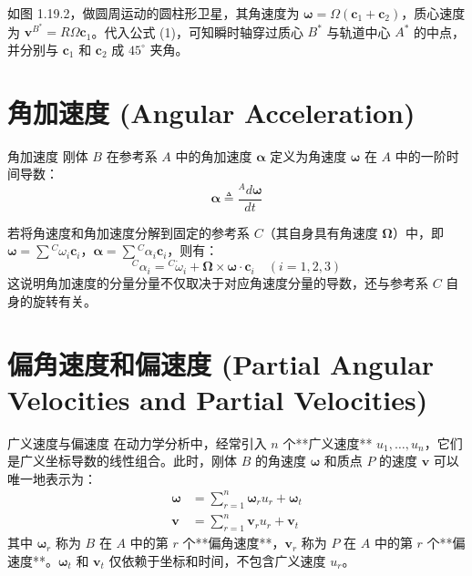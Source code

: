 \begin{example}[圆柱卫星的瞬时轴]
如图 1.19.2，做圆周运动的圆柱形卫星，其角速度为 \(\boldsymbol{\omega} = \Omega (\mathbf{c}_1 + \mathbf{c}_2)\)，质心速度为 \(\mathbf{v}^{B^*} = R\Omega \mathbf{c}_1\)。代入公式 (1)，可知瞬时轴穿过质心 \(B^*\) 与轨道中心 \(A^*\) 的中点，并分别与 \(\mathbf{c}_1\) 和 \(\mathbf{c}_2\) 成 \(45^\circ\) 夹角。
\end{example}

\section{角加速度 (Angular Acceleration)}

\begin{mydefinition}{角加速度}
刚体 \(B\) 在参考系 \(A\) 中的角加速度 \(\boldsymbol{\alpha}\) 定义为角速度 \(\boldsymbol{\omega}\) 在 \(A\) 中的一阶时间导数：
\begin{equation}
\boldsymbol{\alpha} \triangleq \frac{{}^A d\boldsymbol{\omega}}{dt} \tag{1}
\end{equation}
\end{mydefinition}

若将角速度和角加速度分解到固定的参考系 \(C\)（其自身具有角速度 \(\boldsymbol{\Omega}\)）中，即 \(\boldsymbol{\omega} = \sum {}^C\omega_i \mathbf{c}_i\)，\(\boldsymbol{\alpha} = \sum {}^C\alpha_i \mathbf{c}_i\)，则有：
\begin{equation}
{}^C \alpha_i = {}^C \dot{\omega}_i + \boldsymbol{\Omega} \times \boldsymbol{\omega} \cdot \mathbf{c}_i \quad (i=1,2,3) \tag{4}
\end{equation}
这说明角加速度的分量分量不仅取决于对应角速度分量的导数，还与参考系 \(C\) 自身的旋转有关。

\section{偏角速度和偏速度 (Partial Angular Velocities and Partial Velocities)}

\begin{mydefinition}{广义速度与偏速度}
在动力学分析中，经常引入 \(n\) 个**广义速度** \(u_1, \dots, u_n\)，它们是广义坐标导数的线性组合。此时，刚体 \(B\) 的角速度 \(\boldsymbol{\omega}\) 和质点 \(P\) 的速度 \(\mathbf{v}\) 可以唯一地表示为：
\begin{align}
\boldsymbol{\omega} &= \sum_{r=1}^{n} \boldsymbol{\omega}_r u_r + \boldsymbol{\omega}_t \tag{2} \\
\mathbf{v} &= \sum_{r=1}^{n} \mathbf{v}_r u_r + \mathbf{v}_t \tag{3}
\end{align}
其中 \(\boldsymbol{\omega}_r\) 称为 \(B\) 在 \(A\) 中的第 \(r\) 个**偏角速度**，\(\mathbf{v}_r\) 称为 \(P\) 在 \(A\) 中的第 \(r\) 个**偏速度**。\(\boldsymbol{\omega}_t\) 和 \(\mathbf{v}_t\) 仅依赖于坐标和时间，不包含广义速度 \(u_r\)。
\end{mydefinition}

